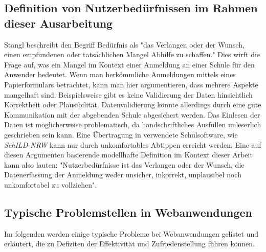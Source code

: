 \subsection{Definition von Nutzerbedürfnissen im Rahmen dieser Ausarbeitung }
\cite{stangl} 
Stangl beschreibt den Begriff Bedürfnis als "das Verlangen oder der Wunsch, einen empfundenen oder tatsächlichen Mangel Abhilfe zu schaffen."\cite{stangl} Dies wirft die Frage auf, was ein Mangel im Kontext einer Anmeldung an einer Schule für den Anwender bedeutet. Wenn man herkömmliche Anmeldungen mittels eines Papierformulars betrachtet, kann man hier argumentieren, dass mehrere Aspekte mangelhaft sind. Beispielsweise gibt es keine Validierung der Daten hinsichtlich Korrektheit oder Plausibilität.  Datenvalidierung könnte allerdings durch eine gute Kommunikation mit der abgebenden Schule abgesichert werden. Das Einlesen der Daten ist möglicherweise problematisch, da handschriftliches Ausfüllen unleserlich geschrieben sein kann. Eine Übertragung in verwendete Schulsoftware, wie \textit{SchILD-NRW} kann nur durch unkomfortables Abtippen erreicht werden.
Eine auf diesen Argumenten basierende modellhafte Definition im Kontext dieser Arbeit kann also lauten: "Nutzerbedürfnisse ist das Verlangen oder der Wunsch, die Datenerfassung der Anmeldung weder unsicher, inkorrekt, unplausibel noch unkomfortabel zu vollziehen".

\subsection{Typische Problemstellen in Webanwendungen}
Im folgenden werden einige typische Probleme bei Webanwendungen gelistet und erläutert, die zu Defiziten der Effektivität und Zufriedenstellung führen können.

